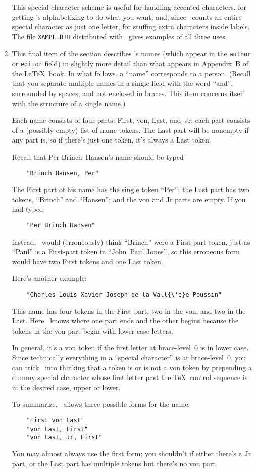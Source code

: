 \begin{enumerate}
This special-character scheme is useful for handling accented characters,
for getting \BibTeX's alphabetizing to do what you want,
and, since \BibTeX\ counts an entire special character as just one letter,
for stuffing extra characters inside labels.
The file \hbox{\tt XAMPL.BIB} distributed with \BibTeX\
gives examples of all three uses.

\item
This final item of the section describes \BibTeX's names
(which appear in the \hbox{\tt author} or \hbox{\tt editor} field)
in slightly more detail than what
appears in Appendix~B of the \LaTeX\ book.
In what follows, a ``name'' corresponds to a person.
(Recall that you separate multiple names in a single field
with the word ``and''$\!$, surrounded by spaces,
and not enclosed in braces.
This item concerns itself with the structure of a single name.)

Each name consists of four parts: First, von, Last, and~Jr;
each part consists of a (possibly empty) list of name-tokens.
The Last part will be nonempty if any part is,
so if there's just one token, it's always a Last token.

Recall that Per Brinch~Hansen's name should be typed
\begin{verbatim}
    "Brinch Hansen, Per"
\end{verbatim}
The First part of his name has the single token ``Per'';
the Last part has two tokens, ``Brinch'' and ``Hansen'';
and the von and Jr parts are empty.
If you had typed
\begin{verbatim}
    "Per Brinch Hansen"
\end{verbatim}
instead, \BibTeX\ would (erroneously) think ``Brinch'' were a First-part token,
just as ``Paul'' is a First-part token in ``John~Paul Jones''$\!$,
so this erroneous form would have two First tokens and one Last token.

Here's another example:
\begin{verbatim}
    "Charles Louis Xavier Joseph de la Vall{\'e}e Poussin"
\end{verbatim}
This name has four tokens in the First part, two in the von, and
two in the Last.
Here \BibTeX\ knows where one part ends and the other begins because
the tokens in the von part begin with lower-case letters.

In general, it's a von token if the first letter at brace-level~0
is in lower case.
Since technically everything
in a ``special character'' is at brace-level~0,
you can trick \BibTeX\ into thinking that
a token is or is not a von token by prepending a dummy
special character whose first letter past the \TeX\ control sequence
is in the desired case, upper or lower.

To summarize, \BibTeX\ allows three possible forms for the name:
\begin{verbatim}
    "First von Last"
    "von Last, First"
    "von Last, Jr, First"
\end{verbatim}
You may almost always use the first form;
you shouldn't if either there's a Jr part,
or the Last part has multiple tokens but there's no von part.

\end{enumerate}




